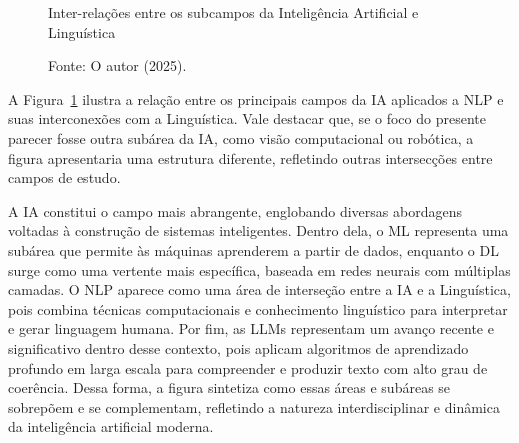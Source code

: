 \begin{figure}[H]
\centering
\caption{Inter-relações entre os subcampos da Inteligência Artificial e Linguística}
\caption*{Fonte: O autor (2025).}
\label{fig:vennIA}
\end{figure}

A Figura~\ref{fig:vennIA} ilustra a relação entre os principais campos da IA aplicados a NLP e suas interconexões com a Linguística. Vale destacar que, se o foco do presente parecer fosse outra subárea da IA, como visão computacional ou robótica, a figura apresentaria uma estrutura diferente, refletindo outras intersecções entre campos de estudo.

A IA constitui o campo mais abrangente, englobando diversas abordagens voltadas à construção de sistemas inteligentes. Dentro dela, o ML representa uma subárea que permite às máquinas aprenderem a partir de dados, enquanto o DL surge como uma vertente mais específica, baseada em redes neurais com múltiplas camadas. O NLP aparece como uma área de interseção entre a IA e a Linguística, pois combina técnicas computacionais e conhecimento linguístico para interpretar e gerar linguagem humana. Por fim, as LLMs representam um avanço recente e significativo dentro desse contexto, pois aplicam algoritmos de aprendizado profundo em larga escala para compreender e produzir texto com alto grau de coerência. Dessa forma, a figura sintetiza como essas áreas e subáreas se sobrepõem e se complementam, refletindo a natureza interdisciplinar e dinâmica da inteligência artificial moderna.